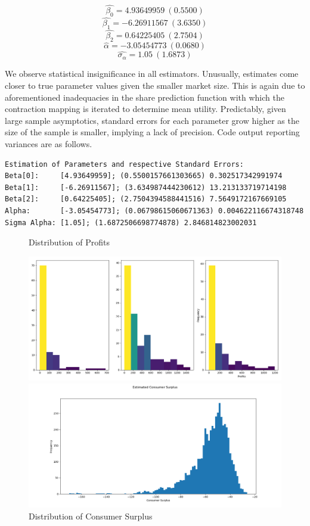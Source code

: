 \documentclass{article}
\begin{document}
$$\hat{\beta_0}=4.93649959\:(0.5500)$$
$$\hat{\beta_1}=-6.26911567\:(3.6350)$$
$$\hat{\beta_2}=0.64225405\:(2.7504)$$
$$\hat{\alpha}=-3.05454773\:(0.0680)$$
$$\hat{\sigma_{\alpha}}=1.05\:(1.6873)$$

We observe statistical insignificance in all estimators. Unusually, estimates come closer to true parameter values given the smaller market size. This is again due to aforementioned inadequacies in the share prediction function with which the contraction mapping is iterated to determine mean utility. Predictably, given large sample asymptotics, standard errors for each parameter grow higher as the size of the sample is smaller, implying a lack of precision. Code output reporting variances are as follows.

\begin{lstlisting}
Estimation of Parameters and respective Standard Errors:
Beta[0]:     [4.93649959]; (0.5500157661303665) 0.302517342991974
Beta[1]:     [-6.26911567]; (3.634987444230612) 13.213133719714198
Beta[2]:     [0.64225405]; (2.7504394588441516) 7.5649172167669105
Alpha:       [-3.05454773]; (0.06798615060671363) 0.004622116674318748
Sigma Alpha: [1.05]; (1.6872506698774878) 2.846814823002031
\end{lstlisting}

\begin{figure}[h]
  \caption{Distribution of Profits}
  \centering
    \includegraphics[width=1.0\textwidth]{fig_hist_profits10_e}
  \caption{Distribution of Consumer Surplus}
  \centering
    \includegraphics[width=1.0\textwidth]{fig_hist_consumersurplus10_e}
\end{figure}
\FloatBarrier
\end{document}

